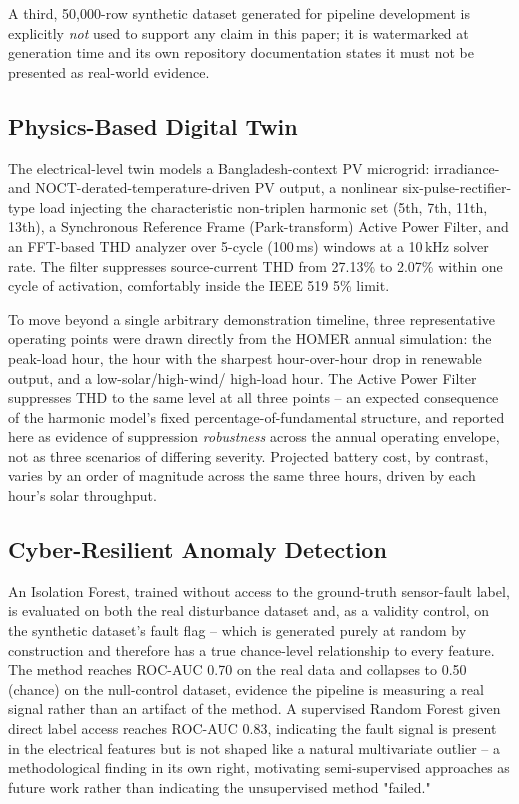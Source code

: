 \documentclass[conference]{IEEEtran}
\begin{document}
A third, 50,000-row synthetic dataset generated for pipeline
development is explicitly \emph{not} used to support any claim in
this paper; it is watermarked at generation time and its own
repository documentation states it must not be presented as
real-world evidence.

\subsection{Physics-Based Digital Twin}
\label{sec:twin}
The electrical-level twin models a Bangladesh-context PV microgrid:
irradiance- and NOCT-derated-temperature-driven PV output, a
nonlinear six-pulse-rectifier-type load injecting the characteristic
non-triplen harmonic set (5th, 7th, 11th, 13th), a Synchronous
Reference Frame (Park-transform) Active Power Filter, and an
FFT-based THD analyzer over 5-cycle (100\,ms) windows at a 10\,kHz
solver rate. The filter suppresses source-current THD from 27.13\%
to 2.07\% within one cycle of activation, comfortably inside the IEEE
519 5\% limit.

To move beyond a single arbitrary demonstration timeline, three
representative operating points were drawn directly from the HOMER
annual simulation: the peak-load hour, the hour with the sharpest
hour-over-hour drop in renewable output, and a low-solar/high-wind/
high-load hour. The Active Power Filter suppresses THD to the same
level at all three points -- an expected consequence of the harmonic
model's fixed percentage-of-fundamental structure, and reported here
as evidence of suppression \emph{robustness} across the annual
operating envelope, not as three scenarios of differing severity.
Projected battery cost, by contrast, varies by an order of magnitude
across the same three hours, driven by each hour's solar throughput.

\subsection{Cyber-Resilient Anomaly Detection}
An Isolation Forest, trained without access to the ground-truth
sensor-fault label, is evaluated on both the real disturbance dataset
and, as a validity control, on the synthetic dataset's fault flag --
which is generated purely at random by construction and therefore
has a true chance-level relationship to every feature. The method
reaches ROC-AUC 0.70 on the real data and collapses to 0.50 (chance)
on the null-control dataset, evidence the pipeline is measuring a
real signal rather than an artifact of the method. A supervised
Random Forest given direct label access reaches ROC-AUC 0.83,
indicating the fault signal is present in the electrical features but
is not shaped like a natural multivariate outlier -- a methodological
finding in its own right, motivating semi-supervised approaches as
future work rather than indicating the unsupervised method "failed."
\end{document}
